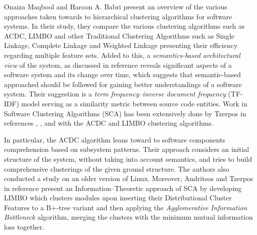 \documentclass[sigconf,review, anonymous]{acmart}
\begin{document}

Onaiza Maqbool and Haroon A. Babri \cite{maqbool_overview} present an
overview of the various approaches taken towards to hierarchical clustering algorithms
for software systems. In their study, they compare the various clustering algorithms
such as ACDC, LIMBO and other Traditional Clustering Algorithms such as Single
Linkage, Complete Linkage \cite{complete} and Weighted Linkage presenting their efficiency regarding 
multiple feature sets. 
Added to this, a \emph{semantics-based architectural view} of the system, as discussed in reference
\cite{large_study} reveals significant aspects of a software system and its change over 
time, which suggests that semantic-based approached should be followed for gaining better 
understandings of a software system. Their suggestion is a \emph{term frequency--inverse 
document frequency} (TF-IDF) model serving as a similarity metric between source code 
entities. 
Work in Software Clustering Algorithms (SCA) has been extensively done by Tzerpos in
references \cite{mojo}, \cite{stability}, \cite{acdc} and \cite{limbo} with the ACDC
and LIMBO clustering algorithms. 

In particular, the ACDC algorithm leans toward to software components comprehension 
based on subsystem patterns. Their approach considers an initial structure of the system, without taking into account semantics, and tries to build comprehensive clusterings of the given ground structure. The authors also conducted a study on an older version of  Linux. 
Moreover, Andritsos and Tzerpos in reference \cite{limbo} present an Information--Theoretic 
approach of SCA by developing LIMBO which clusters modules upon inserting their Distributional Cluster Features to a B+-tree variant and then applying the \emph{Agglomerative Information Bottleneck} algorithm, merging the clusters with the minimum mutual information loss together. 
\end{document}
